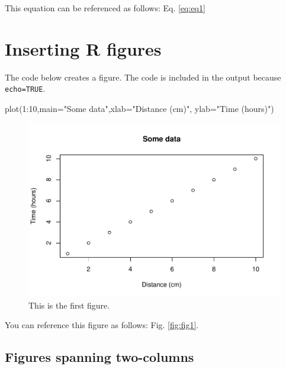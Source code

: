 \documentclass[webpdf,large,contemporary,namedate]{oup-authoring-template}
\newenvironment{Shaded}{\begin{snugshade}}{\end{snugshade}}
\newcommand{\AttributeTok}[1]{\textcolor[rgb]{0.77,0.63,0.00}{#1}}
\newcommand{\DecValTok}[1]{\textcolor[rgb]{0.00,0.00,0.81}{#1}}
\newcommand{\FunctionTok}[1]{\textcolor[rgb]{0.00,0.00,0.00}{#1}}
\newcommand{\NormalTok}[1]{#1}
\newcommand{\SpecialCharTok}[1]{\textcolor[rgb]{0.00,0.00,0.00}{#1}}
\newcommand{\StringTok}[1]{\textcolor[rgb]{0.31,0.60,0.02}{#1}}
\theoremstyle{thmstyleone}
\theoremstyle{thmstyletwo}
\theoremstyle{thmstylethree}
\begin{document}
This equation can be referenced as follows: Eq. \ref{eq:eq1}

\hypertarget{inserting-r-figures}{%
\section{Inserting R figures}\label{inserting-r-figures}}

The code below creates a figure. The code is included in the output
because \texttt{echo=TRUE}.

\begin{Shaded}
\begin{Highlighting}[]
\FunctionTok{plot}\NormalTok{(}\DecValTok{1}\SpecialCharTok{:}\DecValTok{10}\NormalTok{,}\AttributeTok{main=}\StringTok{"Some data"}\NormalTok{,}\AttributeTok{xlab=}\StringTok{"Distance (cm)"}\NormalTok{,}
     \AttributeTok{ylab=}\StringTok{"Time (hours)"}\NormalTok{)}
\end{Highlighting}
\end{Shaded}

\begin{figure}[th]
\includegraphics[width=1\linewidth]{x_files/figure-latex/figa-1} \caption{This is the first figure.}\label{fig:figa}
\end{figure}

You can reference this figure as follows: Fig. \ref{fig:fig1}.

\hypertarget{figures-spanning-two-columns}{%
\subsection{Figures spanning
two-columns}\label{figures-spanning-two-columns}}
\end{document}
